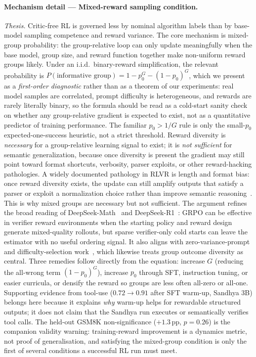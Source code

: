 \documentclass[12pt,a4paper]{report}
\begin{document}
\paragraph{Mechanism detail --- Mixed-reward sampling condition.}
\emph{Thesis.} Critic-free RL is governed less by nominal algorithm labels than by base-model sampling competence and reward variance. The core mechanism is mixed-group probability: the group-relative loop can only update meaningfully when the base model, group size, and reward function together make non-uniform reward groups likely. Under an i.i.d.\ binary-reward simplification, the relevant probability is $P(\text{informative group}) = 1 - p_0^{G} - (1-p_0)^{G}$, which we present as a \emph{first-order diagnostic} rather than as a theorem of our experiments: real model samples are correlated, prompt difficulty is heterogeneous, and rewards are rarely literally binary, so the formula should be read as a cold-start sanity check on whether any group-relative gradient is expected to exist, not as a quantitative predictor of training performance. The familiar $p_0 > 1/G$ rule is only the small-$p_0$ expected-one-success heuristic, not a strict threshold. Reward diversity is \emph{necessary} for a group-relative learning signal to exist; it is \emph{not sufficient} for semantic generalization, because once diversity is present the gradient may still point toward format shortcuts, verbosity, parser exploits, or other reward-hacking pathologies. 
A widely documented pathology in RLVR is length and format bias: once reward diversity exists, the update can still amplify outputs that satisfy a parser or exploit a normalization choice rather than improve semantic reasoning~\citep{gao2023scaling,liu2025understanding,shao2025spurious}. This is why mixed groups are necessary but not sufficient. The argument refines the broad reading of DeepSeek-Math~\citep{shao2024deepseekmath} and DeepSeek-R1~\citep{deepseek2025r1}: GRPO can be effective in verifier reward environments when the starting policy and reward design generate mixed-quality rollouts, but sparse verifier-only cold starts can leave the estimator with no useful ordering signal. It also aligns with zero-variance-prompt and difficulty-selection work~\citep{rlzvp2025,bae2025online,rcgrpo2026,pikus2025hardexamples}, which likewise treats group outcome diversity as central. Three remedies follow directly from the equation: increase $G$ (reducing the all-wrong term $(1-p_0)^G$), increase $p_0$ through SFT, instruction tuning, or easier curricula, or densify the reward so groups are less often all-zero or all-one. Supporting evidence from tool-use ($0.72 \to 0.91$ after SFT warm-up, Sandhya 3B) belongs here because it explains \emph{why} warm-up helps for rewardable structured outputs; it does not claim that the Sandhya run executes or semantically verifies tool calls. The held-out GSM8K non-significance ($+1.3$\,pp, $p{=}0.26$) is the companion validity warning: training-reward improvement is a dynamics metric, not proof of generalisation, and satisfying the mixed-group condition is only the first of several conditions a successful RL run must meet.
\end{document}
